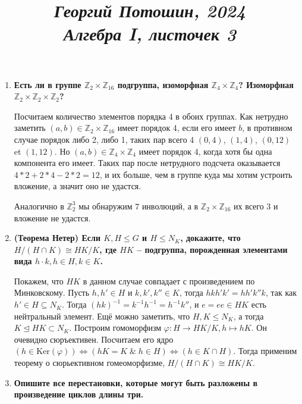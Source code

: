 \documentclass{article}
\title{
\textit{\small{Георгий Потошин, 2024}}\\
\vspace{0.3ex}
\textit{\huge{Алгебра I, листочек 3}}\vspace{1ex}
}
\date{\vspace{-10ex}}
\begin{document}
\maketitle

\begin{enumerate}
    \item \textbf{Есть ли в группе $\mathbb{Z}_2\times\mathbb{Z}_{16}$ подгруппа,
        изоморфная $\mathbb{Z}_4\times \mathbb{Z}_4$? Изоморфная $\mathbb{Z}_2
        \times\mathbb{Z}_2\times\mathbb{Z}_2$?}

        Посчитаем количество элементов порядка 4 в обоих группах. Как нетрудно
        заметить $(a,b)\in\mathbb{Z}_2\times\mathbb{Z}_{16}$ имеет порядок 4, если его
        имеет $b$, в противном случае порядок либо 2, либо 1, таких пар всего 4
        $(0,4)$, $(1,4)$, $(0,12)$ et $(1,12)$. Но $(a,b)\in\mathbb{Z}_4\times
        \mathbb{Z}_4$ имеет порядок 4, когда хотя бы одна компонента его имеет.
        Таких пар после нетрудного подсчета оказывается $4*2+2*4-2*2=12$, и их
        больше, чем в группе куда мы хотим устроить вложение, а значит оно не
        удастся.

        Аналогично в $\mathbb{Z}_2^3$ мы обнаружим $7$ инволюций, а в
        $\mathbb{Z}_2\times\mathbb{Z}_{16}$ их всего $3$ и вложение не удастся.

    \item \textbf{(Теорема Нетер) Если $K,H\leq G$ и $H\leq N_K$, докажите, что
        $H/(H\cap K)\cong HK/K$, где $HK$ – подгруппа, порожденная элементами 
        вида $h\cdot k,h\in H,k\in K$.}

        Покажем, что $HK$ в данном случае совпадает с произведением по
        Минковскому. Пусть $h,h'\in H$ и  $k,k',k''\in K$, тогда $hkh'k'=hh'k''k$,
        так как $h'\in H\subseteq N_K$. Тогда $(hk)^{-1}=k^{-1}h^{-1}=h^{-1}k''$,
        и $e=ee\in HK$ есть нейтральный элемент. 
        Ещё можно заметить, что $H,K\leq N_K$, а тогда $K\trianglelefteq HK
        \subset N_K$. Построим гомоморфизм $\varphi:H\longrightarrow HK/K, h\mapsto hK$.
        Он очевидно сюръективен. Посчитаем его ядро $(h\in\text{Ker}(\varphi))
        \Leftrightarrow (hK=K\;\&\; h\in H)\Leftrightarrow( h\in K\cap H)$.
        Тогда применим теорему о сюрьективном гомеоморфизме, $H/(H\cap K)\cong HK/K$.

    \item \textbf{Опишите все перестановки, которые могут быть разложены в
        произведение циклов длины три.}


\end{enumerate}
\end{document}
